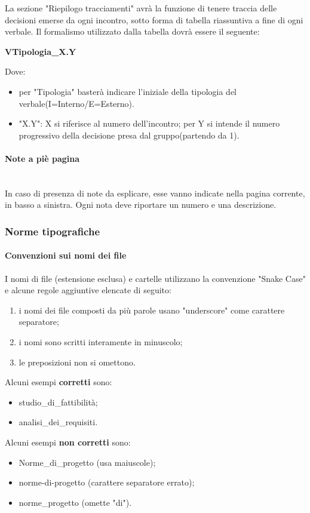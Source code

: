 		La sezione "Riepilogo tracciamenti" avrà la funzione di tenere traccia delle decisioni emerse da ogni incontro, sotto forma di tabella riassuntiva a fine di ogni verbale. Il formalismo utilizzato dalla tabella dovrà essere il seguente: \newline
		\centerline{\textbf{VTipologia\_X.Y}} \newline \newline
		Dove:
		\begin{itemize}
			\item per "Tipologia" basterà indicare l'iniziale della tipologia del verbale(I=Interno/E=Esterno).
			\item "X.Y": X si riferisce al numero dell'incontro; per Y si intende il numero progressivo della decisione presa dal gruppo(partendo da 1).
		\end{itemize}	
		\paragraph{Note a piè pagina} \mbox{}\\
		In caso di presenza di note da esplicare, esse vanno indicate nella pagina corrente, in basso a sinistra. Ogni nota deve riportare un numero e una descrizione.		
	\subsubsection{Norme tipografiche}
		\paragraph{Convenzioni sui nomi dei file}
		I nomi di file (estensione esclusa) e cartelle utilizzano la convenzione "Snake Case\glo" e alcune regole aggiuntive elencate di seguito:
		\begin{enumerate}
			\item i nomi dei file composti da più parole usano "underscore" come carattere separatore;
			\item i nomi sono scritti interamente in minuscolo;
			\item le preposizioni non si omettono.
		\end{enumerate}
		Alcuni esempi \textbf{corretti} sono:
		\begin{itemize}
			\item studio\_di\_fattibilità;
			\item analisi\_dei\_requisiti.
		\end{itemize}	 	
		Alcuni esempi \textbf{non corretti} sono: 
		\begin{itemize}
			\item Norme\_di\_progetto (usa maiuscole);
			\item norme-di-progetto (carattere separatore errato);
			\item norme\_progetto (omette "di").
		\end{itemize}
